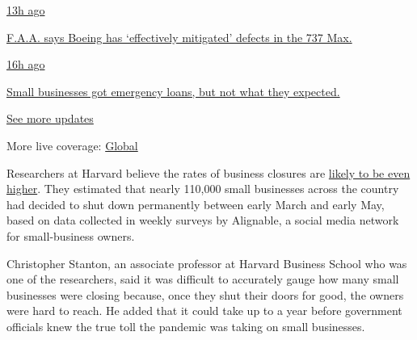 \href{https://www.nytimes3xbfgragh.onion/live/2020/08/03/business/stock-market-today-coronavirus?action=click\&pgtype=Article\&state=default\&region=MAIN_CONTENT_1\&context=storylines_live_updates\#faa-says-boeing-has-effectively-mitigated-defects-in-the-737-max}{13h
ago}

\href{https://www.nytimes3xbfgragh.onion/live/2020/08/03/business/stock-market-today-coronavirus?action=click\&pgtype=Article\&state=default\&region=MAIN_CONTENT_1\&context=storylines_live_updates\#faa-says-boeing-has-effectively-mitigated-defects-in-the-737-max}{F.A.A.
says Boeing has `effectively mitigated' defects in the 737 Max.}

\href{https://www.nytimes3xbfgragh.onion/live/2020/08/03/business/stock-market-today-coronavirus?action=click\&pgtype=Article\&state=default\&region=MAIN_CONTENT_1\&context=storylines_live_updates\#small-businesses-got-emergency-loans-but-not-what-they-expected}{16h
ago}

\href{https://www.nytimes3xbfgragh.onion/live/2020/08/03/business/stock-market-today-coronavirus?action=click\&pgtype=Article\&state=default\&region=MAIN_CONTENT_1\&context=storylines_live_updates\#small-businesses-got-emergency-loans-but-not-what-they-expected}{Small
businesses got emergency loans, but not what they expected.}

\href{https://www.nytimes3xbfgragh.onion/live/2020/08/03/business/stock-market-today-coronavirus?action=click\&pgtype=Article\&state=default\&region=MAIN_CONTENT_1\&context=storylines_live_updates}{See
more updates}

More live coverage:
\href{https://www.nytimes3xbfgragh.onion/2020/08/04/world/coronavirus-covid-19.html?action=click\&pgtype=Article\&state=default\&region=MAIN_CONTENT_1\&context=storylines_live_updates}{Global}

Researchers at Harvard believe the rates of business closures are
\href{https://www.nber.org/papers/w26989.pdf}{likely to be even higher}.
They estimated that nearly 110,000 small businesses across the country
had decided to shut down permanently between early March and early May,
based on data collected in weekly surveys by Alignable, a social media
network for small-business owners.

Christopher Stanton, an associate professor at Harvard Business School
who was one of the researchers, said it was difficult to accurately
gauge how many small businesses were closing because, once they shut
their doors for good, the owners were hard to reach. He added that it
could take up to a year before government officials knew the true toll
the pandemic was taking on small businesses.

